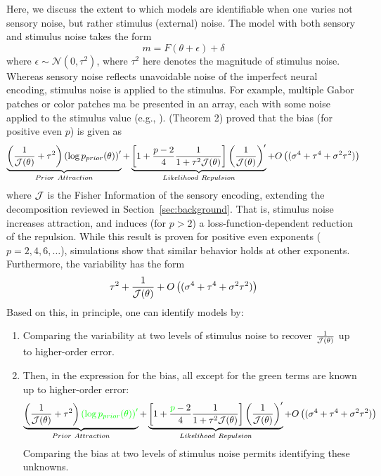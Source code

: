\documentclass[si.tex]{subfiles}
\begin{document}
Here, we discuss the extent to which models are identifiable when one varies not sensory noise, but rather  stimulus (external) noise.
The model with both sensory and stimulus noise takes the form
\begin{equation}\label{eq:both-noise-types}
    m = F(\theta+\epsilon)+\delta
\end{equation}
where $\epsilon \sim \mathcal{N}(0,\tau^2)$, where $\tau^2$ here denotes the magnitude of stimulus noise.
Whereas sensory noise reflects unavoidable noise of the imperfect neural encoding, stimulus noise is applied to the stimulus. For example, multiple Gabor patches or color patches ma be presented in an array, each with some noise applied to the stimulus value (e.g., \cite{Tomassini2010OrientationUR, Girshick2011CardinalRV, Olkkonen2014TheCT}).
\citet{hahn2024unifying} (Theorem 2) proved that the bias (for positive even $p$) is given as
\begin{equation}\label{eq:stim-noise-bias}
        \underbrace{\left(\frac{1}{\FI(\theta)} + \tau^2\right)    \left( \log p_{prior}(\theta) \right)'}_{Prior\ Attraction}   + \underbrace{\left[ 1               + \frac{p-2}{4}     \frac{1}{1+\tau^2\FI(\theta)}    \right]   \left(\frac{1}{\FI(\theta)}\right)' }_{Likelihood\ Repulsion} + O\left((\sigma^4+\tau^4+\sigma^2\tau^2)\right)
        \end{equation}
        where $\mathcal{J}$ is the Fisher Information of the sensory encoding, extending the decomposition reviewed in Section~\ref{sec:background}.
        That is, stimulus noise increases attraction, and induces (for $p>2$) a loss-function-dependent reduction of the repulsion.
        While this result is proven for positive even exponents ($p=2,4,6,\dots$), simulations \citet[][SI Appendix, Figure S5]{hahn2024unifying} show that similar behavior holds at other exponents.
        Furthermore,  the variability has the form
        \begin{equation}
            \tau^2 + \frac{1}{\mathcal{J}(\theta)}  + O\left((\sigma^4+\tau^4+\sigma^2\tau^2)\right)
        \end{equation}
Based on this, in principle, one can identify models by:
\begin{enumerate}
    \item Comparing the variability at two levels of stimulus noise to recover $\frac{1}{\mathcal{J}(\theta)}$ up to higher-order error.
    \item Then, in the expression for the bias, all except for the green terms are known up to higher-order error:
    \begin{equation}
        \underbrace{\left(\frac{1}{\mathcal{J}(\theta)} + \tau^2\right)    \textcolor{green}{\left( \log p_{prior}(\theta) \right)'}}_{Prior\ Attraction}   + \underbrace{\left[ 1               + \frac{\textcolor{green}{p}-2}{4}     \frac{1}{1+\tau^2\mathcal{J}(\theta)}    \right]   \left(\frac{1}{\mathcal{J}(\theta)}\right)' }_{Likelihood\ Repulsion} + O\left((\sigma^4+\tau^4+\sigma^2\tau^2)\right)
        \end{equation}
        Comparing the bias at two levels of stimulus noise permits identifying these unknowns.
\end{enumerate}
\end{document}
